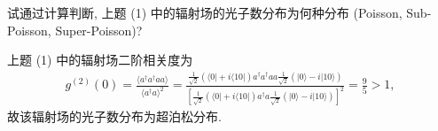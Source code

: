 \documentclass{assignment}
\begin{document}
\begin{prob}[20 分]
    试通过计算判断, 上题 (1) 中的辐射场的光子数分布为何种分布 (Poisson, Sub-Poisson, Super-Poisson)?
\end{prob}
\begin{sol}
    上题 (1) 中的辐射场二阶相关度为
    \begin{align}
        g^{(2)}(0)=\frac{\langle a^{\dagger}a^{\dagger}aa\rangle}{\langle a^{\dagger}a\rangle^2}=\frac{\frac{1}{\sqrt{2}}(\langle 0\rvert+i\langle 10\rvert)a^{\dagger}a^{\dagger}aa\frac{1}{\sqrt{2}}(\lvert 0\rangle-i\lvert 10\rangle)}{\left[\frac{1}{\sqrt{2}}(\langle 0\rvert+i\langle 10\rvert)a^{\dagger}a\frac{1}{\sqrt{2}}(\lvert 0\rangle-i\lvert 10\rangle)\right]^2}=\frac{9}{5}>1,
    \end{align}
    故该辐射场的光子数分布为超泊松分布.
\end{sol}
\end{document}
